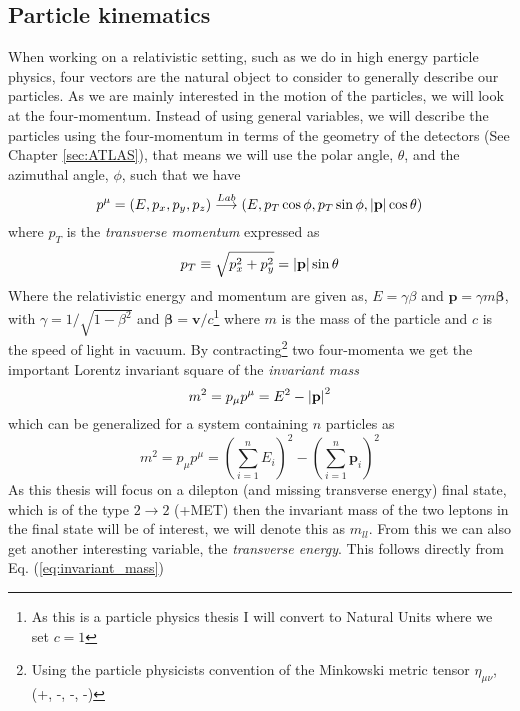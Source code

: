 \documentclass[12pt, a4paper]{book}
\begin{document}
\subsection{Particle kinematics}\label{sec:particle_kinematics}
When working on a relativistic setting, such as we do in high energy particle physics, four vectors are the natural object to consider to generally describe our particles. As we are mainly interested in the motion of the particles, 
we will look at the four-momentum. Instead of using general variables, we will describe the particles using the four-momentum in terms of the geometry of the detectors (See Chapter \ref{sec:ATLAS}), that means we will use 
the polar angle, $\theta$, and the azimuthal angle, $\phi$, such that we have
\begin{equation}\label{eq:four-momentum}
    p^\mu = (E, p_x, p_y, p_z) \overset{Lab}{\longrightarrow} (E, p_T\cos\phi, p_T\sin\phi, \abs{\mathbf{p}}\cos\theta)
\end{equation}
where $p_T$ is the \textit{transverse momentum} expressed as
\begin{equation}\label{eq:transverse_momentum}
    p_T \equiv\sqrt{p_x^2 +p_y^2} = \abs{\mathbf{p}}\sin\theta
\end{equation}
Where the relativistic energy and momentum are given as, $E=\gamma\beta$ and $\mathbf{p}=\gamma m\bm\beta$, with $\gamma = 1/\sqrt{1-\beta^2}$ and $\bm\beta = \mathbf{v}/c$\footnote{As this is a particle physics thesis I will convert to Natural Units where we set $c=1$} 
where $m$ is the mass of the particle 
and $c$ is the speed of light in vacuum. By contracting\footnote{Using the particle physicists convention of the Minkowski metric tensor $\eta_{\mu\nu}$,  (+, -, -, -)} two four-momenta we get the important Lorentz invariant 
square of the \textit{invariant mass}
$$
    m^2 = p_\mu p^\mu = E^2 - \abs{\mathbf{p}}^2 
$$
which can be generalized for a system containing $n$ particles as
\begin{equation}\label{eq:invariant_mass}
    m^2 = p_\mu p^\mu = \left(\sum_{i=1}^n E_i\right)^2 - \left(\sum_{i=1}^n\mathbf{p}_i\right)^2
\end{equation}
As this thesis will focus on a dilepton (and missing transverse energy) final state, which is of the type $2\rightarrow2$ (+MET) then the invariant mass of the two leptons in the final state will be of interest, 
we will denote this as $m_{ll}$. From this we can also get another interesting variable, the \textit{transverse energy}. This follows directly from Eq. (\ref{eq:invariant_mass})
\end{document}
